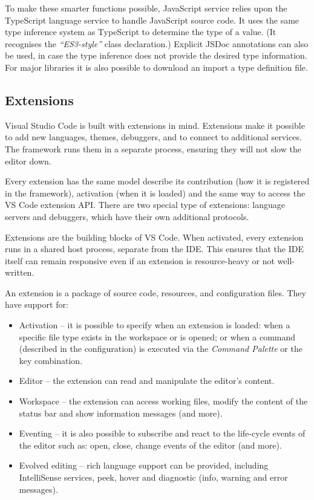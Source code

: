 To make these smarter functions possible, JavaScript service relies upon the TypeScript language service to handle JavaScript source code. It uses the same type inference system as TypeScript to determine the type of a value. (It recognises the \emph{``ES3-style''} class declaration.) Explicit JSDoc annotations can also be used, in case the type inference does not provide the desired type information. For major libraries it is also possible to download an import a type definition file.

\subsection{Extensions}
Visual Studio Code is built with extensions in mind. Extensions make it possible to add new languages, themes, debuggers, and to connect to additional services. The framework runs them in a separate process, ensuring they will not slow the editor down.

Every extension has the same model describe its contribution (how it is registered in the framework), activation (when it is loaded) and the same way to access the VS Code extension API. There are two special type of extensions: language servers and debuggers, which have their own additional protocols.

Extensions are the building blocks of VS Code. When activated, every extension runs in a shared host process, separate from the IDE. This ensures that the IDE itself can remain responsive even if an extension is resource-heavy or not well-written.

An extension is a package of source code, resources, and configuration files. They have support for:
\begin{itemize}[topsep=0pt]
  \item Activation -- it is possible to specify when an extension is loaded: when a specific file type exists in the workspace or is opened; or when a command (described in the configuration) is executed via the \emph{Command Palette} or the key combination.
  \item Editor -- the extension can read and manipulate the editor's content.
  \item Workspace -- the extension can access working files, modify the content of the status bar and show information messages (and more).
  \item Eventing -- it is also possible to subscribe and react to the life-cycle events of the editor such as: open, close, change events of the editor (and more).
  \item Evolved editing -- rich language support can be provided, including IntelliSense services, peek, hover and diagnostic (info, warning and error messages).
\end{itemize}

